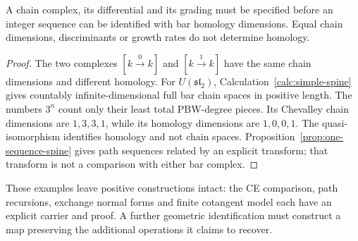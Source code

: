 \begin{theorem}
\label{nogo:scalar-spine}
A chain complex, its differential and its grading must be specified before
an integer sequence can be identified with bar homology dimensions.
Equal chain dimensions, discriminants or growth rates do not determine homology.
\end{theorem}
\begin{proof}
The two complexes $[k\xrightarrow{0}k]$ and $[k\xrightarrow{1}k]$ have the
same chain dimensions and different homology.
For $U(\mathfrak{sl}_2)$, Calculation~\ref{calc:simple-spine} gives
countably infinite-dimensional full bar chain spaces in positive length.
The numbers $3^n$ count only their least total PBW-degree pieces.
Its Chevalley chain dimensions are $1,3,3,1$, while its homology dimensions
are $1,0,0,1$. The quasi-isomorphism identifies homology and not chain spaces.
Proposition~\ref{prop:one-sequence-spine} gives path sequences related by an
explicit transform; that transform is not a comparison with either bar complex.
\end{proof}

These examples leave positive constructions intact: the CE comparison,
path recursions, exchange normal forms and finite cotangent model each have
an explicit carrier and proof. A further geometric identification must construct
a map preserving the additional operations it claims to recover.
